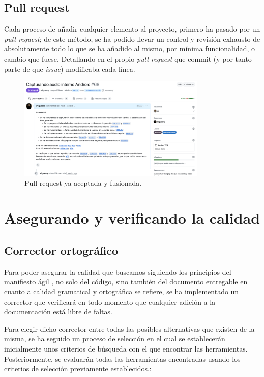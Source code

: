 \subsection{Pull request}

Cada proceso de añadir cualquier elemento al proyecto, primero ha pasado por un
\emph{pull request}; de este método, se ha podido llevar un control y revisión
exhausto de absolutamente todo lo que se ha añadido al mismo, por mínima
funcionalidad, o cambio que fuese. Detallando en el propio \emph{pull request}
que commit (y por tanto parte de que \emph{issue}) modificaba cada línea.

\begin{figure}[H]
    \centering
    \includegraphics[width=0.8\textwidth]{fotos/pull_request.png}
    \caption{Pull request ya aceptada y fusionada.}
\end{figure}


\section{Asegurando y verificando la calidad}

\subsection{Corrector ortográfico}
Para poder asegurar la calidad que buscamos siguiendo los principios del manifiesto
ágil \cite{agile-manifiesto}, no solo del código, sino también del documento
entregable en cuanto a calidad gramatical y ortográfica se refiere, se ha
implementado un corrector que verificará en todo momento que cualquier adición a
la documentación está libre de faltas. 

Para elegir dicho corrector entre todas las posibles alternativas que existen de 
la misma, se ha seguido un proceso de selección en el cual se establecerán 
inicialmente unos criterios de búsqueda con el que encontrar las herramientas. 
Posteriormente, se evaluarán todas las herramientas encontradas usando los 
criterios de selección previamente establecidos.: 


